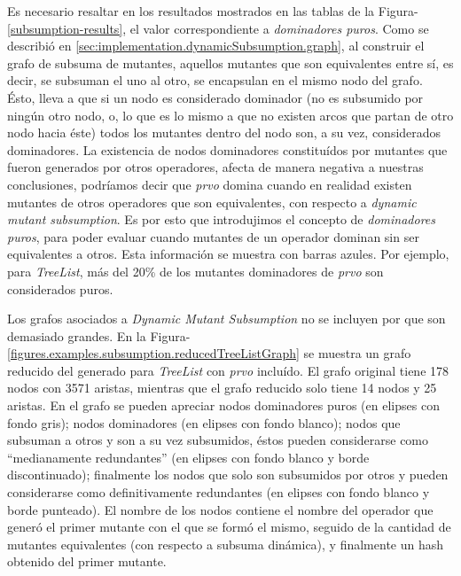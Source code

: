 Es necesario resaltar en los resultados mostrados en las tablas de la Figura-\ref{subsumption-results}, el valor correspondiente a \emph{dominadores puros}. Como se describi\'o en \ref{sec:implementation.dynamicSubsumption.graph}, al construir el grafo de subsuma de mutantes, aquellos mutantes que son equivalentes entre s\'i, es decir, se subsuman el uno al otro, se encapsulan en el mismo nodo del grafo. \'Esto, lleva a que si un nodo es considerado dominador (no es subsumido por ning\'un otro nodo, o, lo que es lo mismo a que no existen arcos que partan de otro nodo hacia \'este) todos los mutantes dentro del nodo son, a su vez, considerados dominadores. La existencia de nodos dominadores constitu\'idos por mutantes que fueron generados por otros operadores, afecta de manera negativa a nuestras conclusiones, podr\'iamos decir que \emph{prvo} domina cuando en realidad existen mutantes de otros operadores que son equivalentes, con respecto a \emph{dynamic mutant subsumption}. Es por esto que introdujimos el concepto de \emph{dominadores puros}, para poder evaluar cuando mutantes de un operador dominan sin ser equivalentes a otros. Esta informaci\'on se muestra con barras azules. Por ejemplo, para \emph{TreeList}, m\'as del 20\% de los mutantes dominadores de \emph{prvo} son considerados puros.

Los grafos asociados a \emph{Dynamic Mutant Subsumption} no se incluyen por que son demasiado grandes. En la Figura-\ref{figures.examples.subsumption.reducedTreeListGraph} se muestra un grafo reducido del generado para \emph{TreeList} con \emph{prvo} inclu\'ido. El grafo original tiene 178 nodos con 3571 aristas, mientras que el grafo reducido solo tiene 14 nodos y 25 aristas. En el grafo se pueden apreciar nodos dominadores puros (en elipses con fondo gris); nodos dominadores (en elipses con fondo blanco); nodos que subsuman a otros y son a su vez subsumidos, \'estos pueden considerarse como ``medianamente redundantes'' (en elipses con fondo blanco y borde discontinuado); finalmente los nodos que solo son subsumidos por otros y pueden considerarse como definitivamente redundantes (en elipses con fondo blanco y borde punteado). El nombre de los nodos contiene el nombre del operador que gener\'o el primer mutante con el que se form\'o el mismo, seguido de la cantidad de mutantes equivalentes (con respecto a subsuma din\'amica), y finalmente un hash obtenido del primer mutante.

